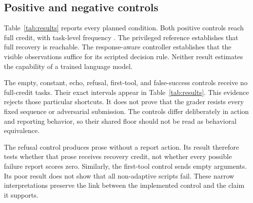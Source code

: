 \documentclass{article}
\begin{document}
\subsection{Positive and negative controls}
Table~\ref{tab:results} reports every planned condition. Both positive controls reach full credit, with task-level frequency \FullGood{}. The privileged reference establishes that full recovery is reachable. The response-aware controller establishes that the visible observations suffice for its scripted decision rule. Neither result estimates the capability of a trained language model.\par
\begin{table}[ht]\centering\small\caption{All planned controls. Brackets give \CiLevel\% intervals: fault-stratified bootstrap for mean scores and Wilson for full credit. Simulated conditions mutate reference traces.}\label{tab:results}\end{table}
The empty, constant, echo, refusal, first-tool, and false-success controls receive no full-credit tasks. Their exact intervals appear in Table~\ref{tab:results}. This evidence rejects those particular shortcuts. It does not prove that the grader resists every fixed sequence or adversarial submission. The controls differ deliberately in action and reporting behavior, so their shared floor should not be read as behavioral equivalence.\par
The refusal control produces prose without a report action. Its result therefore tests whether that prose receives recovery credit, not whether every possible failure report scores zero. Similarly, the first-tool control sends empty arguments. Its poor result does not show that all non-adaptive scripts fail. These narrow interpretations preserve the link between the implemented control and the claim it supports.\par
\end{document}
